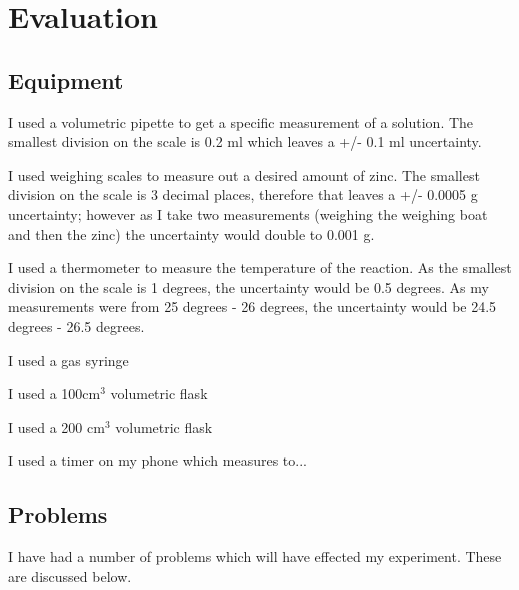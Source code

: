 \chapter {Evaluation}


\section{Equipment}

I used a volumetric pipette to get a specific measurement of a solution. The smallest division on the scale is 0.2 ml which leaves a +/- 0.1 ml uncertainty. 

I used weighing scales to measure out a desired amount of zinc. The smallest division on the scale is 3 decimal places, therefore that leaves a +/- 0.0005 g uncertainty; however as I take two measurements (weighing the weighing boat and then the zinc) the uncertainty would double to 0.001 g.

I used a thermometer to measure the temperature of the reaction. As the smallest division on the scale is 1 degrees, the uncertainty would be 0.5 degrees. As my measurements were from 25 degrees - 26 degrees, the uncertainty would be 24.5 degrees - 26.5 degrees.




I used a gas syringe 

I used a 100cm$^3$ volumetric flask

I used a 200 cm$^3$ volumetric flask

I used a timer on my phone which measures to...

\section{Problems}

I have had a number of problems which will have effected my experiment. These are discussed below.

